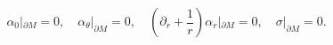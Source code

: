 \begin{equation}
\alpha_0|_{\partial M}=0,\quad
\alpha_\theta |_{\partial M}=0,\quad
\left( \partial_r +\frac 1r \right) \alpha_r |_{\partial M}=0,\quad
\sigma |_{\partial M}=0.\label{asbc}
\end{equation}

